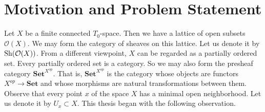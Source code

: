 \section{Motivation and Problem Statement}
Let $X$ be a finite connected $T_0$-space. Then we have a lattice of open subsets $\mathcal{O}(X)$. We may form the category of sheaves on this lattice. Let us denote it by $\operatorname{Sh}(\mathcal{O}(X))$. From a different viewpoint, $X$ can be regarded as a partially ordered set. Every partially ordered set is a category. So we may also form the presheaf category $\mathbf{Set}^{X^{op}}$. That is, $\mathbf{Set}^{X^{op}}$ is the category whose objects are functors $X^{op} \to \mathbf{Set}$ and whose morphisms are natural transformations between them. Observe that every point $x$ of the space $X$ has a minimal open neighborhood. Let us denote it by $U_x \subset X$. This thesis began with the following observation.

